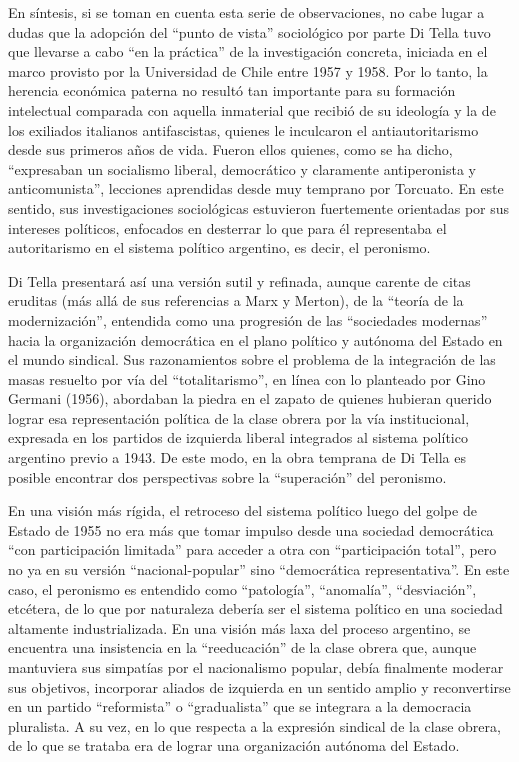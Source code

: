 En síntesis, si se toman en cuenta esta serie de observaciones, no cabe lugar a dudas que la adopción del \enquote{punto de vista} sociológico por parte Di Tella tuvo que llevarse a cabo \enquote{en la práctica} de la investigación concreta, iniciada en el marco provisto por la Universidad de Chile entre 1957 y 1958. Por lo tanto, la herencia económica paterna no resultó tan importante para su formación intelectual comparada con aquella inmaterial que recibió de su ideología y la de los exiliados italianos antifascistas, quienes le inculcaron el antiautoritarismo desde sus primeros años de vida. Fueron ellos quienes, como se ha dicho, \enquote{expresaban un socialismo liberal, democrático y claramente antiperonista y anticomunista}, lecciones aprendidas desde muy temprano por Torcuato. En este sentido, sus investigaciones sociológicas estuvieron fuertemente orientadas por sus intereses políticos, enfocados en desterrar lo que para él representaba el autoritarismo en el sistema político argentino, es decir, el peronismo.

Di Tella presentará así una versión sutil y refinada, aunque carente de citas eruditas (más allá de sus referencias a Marx y Merton), de la \enquote{teoría de la modernización}, entendida como una progresión de las \enquote{sociedades modernas} hacia la organización democrática en el plano político y autónoma del Estado en el mundo sindical. Sus razonamientos sobre el problema de la integración de las masas resuelto por vía del \enquote{totalitarismo}, en línea con lo planteado por Gino Germani (1956), abordaban la piedra en el zapato de quienes hubieran querido lograr esa representación política de la clase obrera por la vía institucional, expresada en los partidos de izquierda liberal integrados al sistema político argentino previo a 1943. De este modo, en la obra temprana de Di Tella es posible encontrar dos perspectivas sobre la \enquote{superación} del peronismo.

En una visión más rígida, el retroceso del sistema político luego del golpe de Estado de 1955 no era más que tomar impulso desde una sociedad democrática \enquote{con participación limitada} para acceder a otra con \enquote{participación total}, pero no ya en su versión \enquote{nacional-popular} sino \enquote{democrática representativa}. En este caso, el peronismo es entendido como \enquote{patología}, \enquote{anomalía}, \enquote{desviación}, etcétera, de lo que por naturaleza debería ser el sistema político en una sociedad altamente industrializada. En una visión más laxa del proceso argentino, se encuentra una insistencia en la \enquote{reeducación} de la clase obrera que, aunque mantuviera sus simpatías por el nacionalismo popular, debía finalmente moderar sus objetivos, incorporar aliados de izquierda en un sentido amplio y reconvertirse en un partido \enquote{reformista} o \enquote{gradualista} que se integrara a la democracia pluralista. A su vez, en lo que respecta a la expresión sindical de la clase obrera, de lo que se trataba era de lograr una organización autónoma del Estado.

